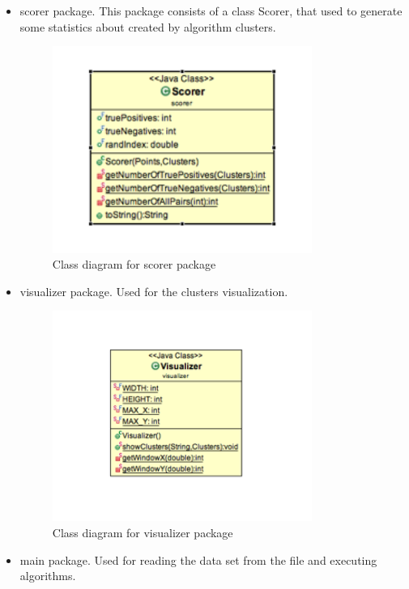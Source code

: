 \documentclass[12pt, a4paper, notitlepage, oneside]{article}
\begin{document}
\begin{itemize}
	\item scorer package. This package consists of a class Scorer, that used to generate some statistics about created by algorithm clusters.

	\begin{figure}[!ht]
 	\centering
	\includegraphics[width=0.8\textwidth]{images/scorer_package.png}
 	\caption[]
	{Class diagram for scorer package}
	\end{figure}

\item visualizer package. Used for  the clusters visualization.

	\begin{figure}[!ht]
 	\centering
	\includegraphics[width=0.8\textwidth]{images/visualizer_package.png}
 	\caption[]
	{Class diagram for visualizer package}
	\end{figure}

\item main package. Used for  reading the data set from the file and executing algorithms.


\end{itemize}
\end{document}
